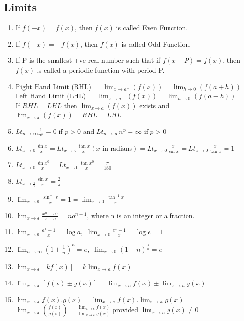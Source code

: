\documentclass{article}
\begin{document}
\subsection*{Limits}
\begin{enumerate}
\item If $f(-x)=f(x)$, then $f(x)$ is called Even Function.
\item If $f(-x)=-f(x)$, then $f(x)$ is called Odd Function.
\item If P is the smallest +ve real number such that if $f(x+P)=f(x)$, then $f(x)$ is called a periodic function with period P.
\item Right Hand Limit (RHL) $= \lim_{x\rightarrow a^{+}}(f(x))=\lim_{h\rightarrow0}(f(a+h))$
\\Left Hand Limit (LHL) $= \lim_{x\rightarrow a^{-}}(f(x))=\lim_{h\rightarrow0}(f(a-h))$
\\If $RHL=LHL$ then $\lim_{x\rightarrow a}(f(x))$ exists and $\lim_{x\rightarrow a}(f(x))=RHL=LHL$
\item $Lt_{n\rightarrow\infty}\frac{1}{n^{p}}=0$ if $p>0$ and $Lt_{n\rightarrow\infty}n^{p}=\infty$ if $p>0$
\item $Lt_{x\rightarrow0}\frac{\sin x}{x}=Lt_{x\rightarrow0}\frac{\tan x}{x}(x \text{ in radians})=Lt_{x\rightarrow0}\frac{x}{\sin x}=Lt_{x\rightarrow0}\frac{x}{\tan x}=1$
\item $Lt_{x\rightarrow0}\frac{\sin x^{0}}{x}=Lt_{x\rightarrow0}\frac{\tan x^{0}}{x}=\frac{\pi}{180}$
\item $Lt_{x\rightarrow\frac{\pi}{2}}\frac{\sin x}{x}=\frac{2}{\pi}$
\item $\lim_{x\rightarrow0}\frac{\sin^{-1}x}{x}=1=\lim_{x\rightarrow0}\frac{\tan^{-1}x}{x}$
\item $\lim_{x\rightarrow a}\frac{x^{n}-a^{n}}{x-a}=na^{n-1}$, where n is an integer or a fraction.
\item $\lim_{x\rightarrow0}\frac{a^{x}-1}{x}=\log a,$ $\lim_{x\rightarrow0}\frac{e^{x}-1}{x}=\log e=1$
\item $\lim_{n\rightarrow\infty}(1+\frac{1}{n})^{n}=e,$ $\lim_{x\rightarrow0}(1+n)^{\frac{1}{n}}=e$
\item $\lim_{x\rightarrow a}[kf(x)]=k\lim_{x\rightarrow a}f(x)$
\item $\lim_{x\rightarrow a}[f(x)\pm g(x)]=\lim_{x\rightarrow a}f(x)\pm \lim_{x\rightarrow a}g(x)$
\item $\lim_{x\rightarrow a}f(x).g(x)=\lim_{x\rightarrow a}f(x).\lim_{x\rightarrow a}g(x)$
\\ $\lim_{x\rightarrow a}(\frac{f(x)}{g(x)})=\frac{\lim_{x\rightarrow a}f(x)}{\lim_{x\rightarrow a}g(x)}$ provided $\lim_{x\rightarrow a}g(x)\ne0$

\end{enumerate}
\end{document}
